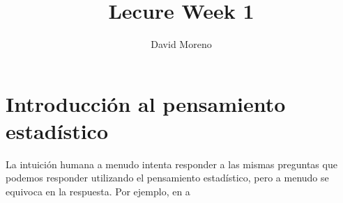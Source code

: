 \documentclass{article}
\author{David Moreno}
\title{Lecure Week 1 }
\theoremstyle{definition}
\begin{document}
\maketitle
\section*{Introducción al pensamiento estadístico}

La intuición humana a menudo intenta responder a las mismas preguntas
que podemos responder utilizando el pensamiento estadístico, pero a
menudo se equivoca en la respuesta.
Por ejemplo, en a
\end{document}
